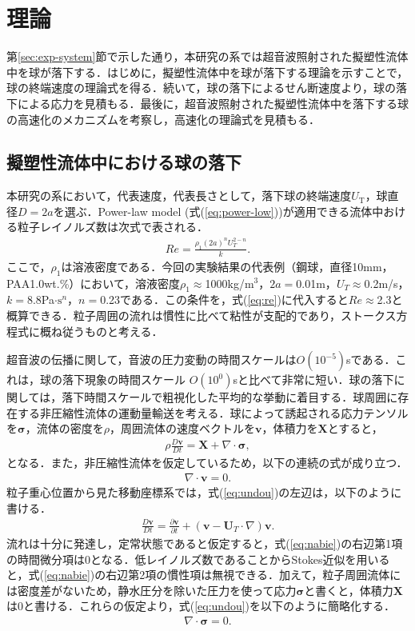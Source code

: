 \section{理論}
第\ref{sec:exp-system}節で示した通り，本研究の系では超音波照射された擬塑性流体中を球が落下する．はじめに，擬塑性流体中を球が落下する理論を示すことで，球の終端速度の理論式を得る．続いて，球の落下によるせん断速度より，球の落下による応力を見積もる．最後に，超音波照射された擬塑性流体中を落下する球の高速化のメカニズムを考察し，高速化の理論式を見積もる．

\subsection{擬塑性流体中における球の落下}
本研究の系において，代表速度，代表長さとして，落下球の終端速度$U_\text{T}$，球直径$D=2a$を選ぶ．Power-law model (式(\ref{eq:power-low}))が適用できる流体中おける粒子レイノルズ数は次式で表される\cite{ref:1,ref:8-5}．
\begin{eqnarray}
    Re = \frac{\rho_1 \left(2a\right)^n U_T^{2-n}}{k} .
    \label{eq:re}
\end{eqnarray}
ここで，$\rho_1$は溶液密度である．今回の実験結果の代表例（鋼球，直径10mm，PAA1.0wt.\%）において，溶液密度$\rho_1\approx$1000kg/m$^3$，$2a=$0.01m，$U_T \approx$0.2m/s，$k=$8.8Pa$\cdot \text{s}^n$，$n=$0.23である．この条件を，式(\ref{eq:re})に代入すると$Re\approx$2.3と概算できる．粒子周囲の流れは慣性に比べて粘性が支配的であり，ストークス方程式に概ね従うものと考える．

超音波の伝播に関して，音波の圧力変動の時間スケールは$O\left(10^{-5}\right)$sである．これは，球の落下現象の時間スケール $O\left(10^{0}\right)$sと比べて非常に短い．球の落下に関しては，落下時間スケールで粗視化した平均的な挙動に着目する．球周囲に存在する非圧縮性流体の運動量輸送を考える．球によって誘起される応力テンソルを$\bm{\sigma}$，流体の密度を$\rho$，周囲流体の速度ベクトルを$\bm{v}$，体積力を$\bm{X}$とすると，
\begin{eqnarray}
    \rho \frac{D\bm{v}}{Dt} = \bm{X} + \nabla \cdot \bm{\sigma} ,
    \label{eq:undou}
\end{eqnarray}
となる．また，非圧縮性流体を仮定しているため，以下の連続の式が成り立つ．
\begin{eqnarray}
    \nabla \cdot \bm{v} = 0 .
    \label{eq:renzoku}
\end{eqnarray}
粒子重心位置から見た移動座標系では，式(\ref{eq:undou})の左辺は，以下のように書ける．
\begin{eqnarray}
    \frac{D\bm{v}}{Dt} = \frac{\partial \bm{v}}{\partial t} + \left(\bm{v} - \bm{U}_T \cdot \nabla \right) \bm{v} .
    \label{eq:nabie}
\end{eqnarray}
流れは十分に発達し，定常状態であると仮定すると，式(\ref{eq:nabie})の右辺第1項の時間微分項は0となる．低レイノルズ数であることからStokes近似を用いると，式(\ref{eq:nabie})の右辺第2項の慣性項は無視できる．加えて，粒子周囲流体には密度差がないため，静水圧分を除いた圧力を使って応力${\bm \sigma}$と書くと，体積力${\bm X}$は0と書ける．これらの仮定より，式(\ref{eq:undou})を以下のように簡略化する．
\begin{eqnarray}
    \nabla \cdot \bm{\sigma} = 0 .
    \label{eq:sigma-}
\end{eqnarray}

